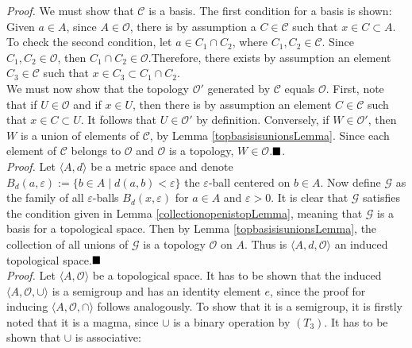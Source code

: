 \textit{Proof.}
We must show that $\mathcal{C}$ is a basis. The first condition for a basis is shown: Given $a\in A$, since $A\in\mathcal{O}$, there is by assumption a $C\in\mathcal{C}$ such that $x\in C\subset A$. To check the second condition, let $a\in C_1\cap C_2$, where $C_1,C_2\in\mathcal{C}$. Since $C_1,C_2\in\mathcal{O}$, then $C_1\cap C_2\in\mathcal{O}$.Therefore, there exists by assumption an element $C_3\in\mathcal{C}$ such that $x\in C_3\subset C_1\cap C_2$.\\

We must now show that the topology $\mathcal{O}'$ generated by $\mathcal{C}$ equals $\mathcal{O}$. First, note that if $U\in\mathcal{O}$ and if $x\in U$, then there is by assumption an element $C\in\mathcal{C}$ such that $x\in C\subset U$. It follows that $U\in\mathcal{O}'$ by definition. Conversely, if $W\in\mathcal{O}'$, then $W$ is a union of elements of $\mathcal{C}$, by Lemma \ref{topbasisisunionsLemma}. Since each element of $\mathcal{C}$ belongs to $\mathcal{O}$ and $\mathcal{O}$ is a topology, $W\in\mathcal{O}$.$\qed$.\\

\textit{Proof.}
Let $\langle A,d\rangle$ be a metric space and denote $B_d(a,\varepsilon):=\{b\in A\mid d(a,b)<\varepsilon\}$ the $\varepsilon$-ball centered on $b\in A$. Now define $\mathcal{G}$ as the family of all $\varepsilon$-balls $B_d(x,\varepsilon)$ for $a\in A$ and $\varepsilon>0$. It is clear that $\mathcal{G}$ satisfies the condition given in Lemma \ref{collectionopenistopLemma}, meaning that $\mathcal{G}$ is a basis for a topological space. Then by Lemma \ref{topbasisisunionsLemma}, the collection of all unions of $\mathcal{G}$ is a topology $\mathcal{O}$ on $A$. Thus is $\langle A,d,\mathcal{O}\rangle$ an induced topological space.$\qed$\\

\textit{Proof.}
Let $\langle A, \mathcal{O}\rangle$ be a topological space. It has to be shown that the induced $\langle A,\mathcal{O},\cup\rangle$ is a semigroup and has an identity element $e$, since the proof for inducing $\langle A,\mathcal{O},\cap\rangle$ follows analogously. To show that it is a semigroup, it is firstly noted that it is a magma, since $\cup$ is a binary operation by $(T_3)$. It has to be shown that $\cup$ is associative:


